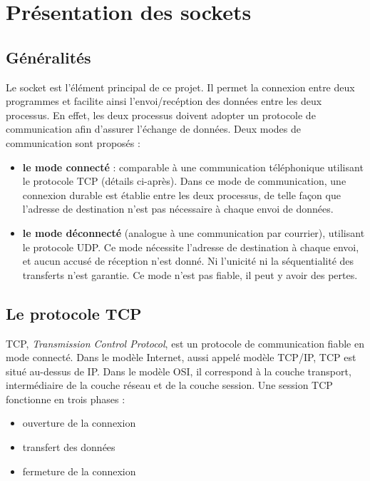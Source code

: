 \section{Présentation des sockets}

    \subsection{Généralités}
    Le socket est l'élément principal de ce projet. Il permet la connexion entre deux programmes et facilite ainsi l'envoi/recéption des données entre les deux processus. En effet, les deux processus doivent adopter un protocole de communication afin d'assurer l'échange de données. Deux modes de communication sont proposés :
    \begin{itemize}
        \item \textbf{le mode connecté} : comparable à une communication téléphonique utilisant le protocole TCP (détails ci-après). Dans ce mode de communication, une connexion durable est établie entre les deux processus, de telle façon que l’adresse de destination n’est pas nécessaire à chaque envoi de données.
        \item \textbf{le mode déconnecté} (analogue à une communication par courrier), utilisant le protocole UDP. Ce mode nécessite l’adresse de destination à chaque envoi, et aucun accusé de réception n’est donné. Ni l'unicité ni la séquentialité des transferts n'est garantie. Ce mode n'est pas fiable, il peut y avoir des pertes.
    \end{itemize}
    
    
    \subsection{Le protocole TCP}
     TCP, \textit{Transmission Control Protocol}, est un protocole de communication fiable en mode connecté. Dans le modèle Internet, aussi appelé modèle TCP/IP, TCP est situé au-dessus de IP. Dans le modèle OSI, il correspond à la couche transport, intermédiaire de la couche réseau et de la couche session. Une session TCP fonctionne en trois phases : 
    \begin{itemize}
        \item ouverture de la connexion
        \item transfert des données
        \item fermeture de la connexion
    \end{itemize}
    
